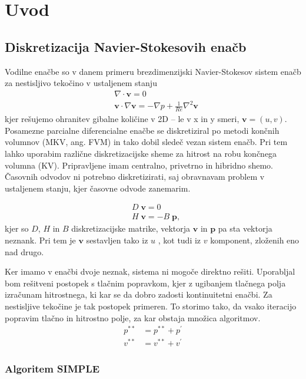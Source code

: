 \section{Uvod}
\subsection{Diskretizacija Navier-Stokesovih enačb}

Vodilne enačbe so v danem primeru brezdimenzijski Navier-Stokesov sistem enačb za nestisljivo tekočino v ustaljenem stanju
\begin{align}
    &\nabla \cdot \mathbf{v} = 0\\
    &\mathbf{v} \cdot \nabla \mathbf{v} = - \nabla p + \frac{1}{Re} \nabla^2 \mathbf{v}\nonumber
\end{align}
kjer rešujemo ohranitev gibalne količine v 2D -- le v x in y smeri, $\mathbf{v}=(u,v)$. Posamezne parcialne diferencialne enačbe se diskretiziral po metodi končnih volumnov (MKV, ang. FVM) in tako dobil sledeč vezan sistem enačb. Pri tem lahko uporabim različne diskretizacijske sheme za hitrost na robu končnega volumna (KV). Pripravljene imam centralno, privetrno in hibridno shemo. Časovnih odvodov ni potrebno diskretizirati, saj obravnavam problem v ustaljenem stanju, kjer časovne odvode zanemarim.

\begin{align}
    &D\;\mathbf{v} = 0\\
    &H\;\mathbf{v} = -B\;\mathbf{p}, \nonumber
\end{align}
kjer so $D$, $H$ in $B$ diskretizacijske matrike, vektorja $\mathbf{v}$ in $\mathbf{p}$ pa sta vektorja neznank. Pri tem je $\mathbf{v}$ sestavljen tako iz $u$ , kot tudi iz $v$ komponent, zloženih eno nad drugo.

Ker imamo v enačbi dvoje neznak, sistema ni mogoče direktno rešiti. Uporabljal bom rešitveni postopek s tlačnim popravkom, kjer z ugibanjem tlačnega polja izračunam hitrostnega, ki kar se da dobro zadosti kontinuitetni enačbi. Za nestisljive tekočine je tak postopek primeren. To storimo tako, da vsako iteracijo popravim tlačno in hitrostno polje, za kar obstaja množica algoritmov.
\begin{align}
    p^{**} &= p^{**} + p^{'}\\
    v^{**} &= v^{**} + v^{'}\nonumber
\end{align}

\subsubsection{Algoritem SIMPLE}

